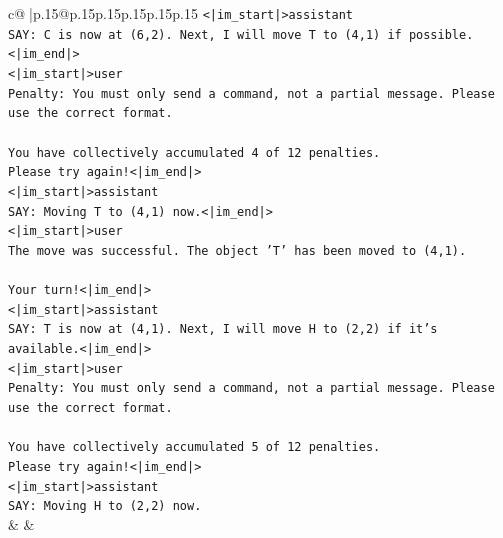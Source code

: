 \documentclass{article}
\begin{document}
{\begin{supertabular}{c@{$\;$}|p{.15\linewidth}@{}p{.15\linewidth}p{.15\linewidth}p{.15\linewidth}p{.15\linewidth}p{.15\linewidth}}
{{{\texttt{<|im\_start|>assistant} \\
\texttt{SAY: C is now at (6,2). Next, I will move T to (4,1) if possible.<|im\_end|>} \\
\texttt{<|im\_start|>user} \\
\texttt{Penalty: You must only send a command, not a partial message. Please use the correct format.} \\
\\ 
\texttt{You have collectively accumulated 4 of 12 penalties.} \\
\texttt{Please try again!<|im\_end|>} \\
\texttt{<|im\_start|>assistant} \\
\texttt{SAY: Moving T to (4,1) now.<|im\_end|>} \\
\texttt{<|im\_start|>user} \\
\texttt{The move was successful. The object 'T' has been moved to (4,1).} \\
\\ 
\texttt{Your turn!<|im\_end|>} \\
\texttt{<|im\_start|>assistant} \\
\texttt{SAY: T is now at (4,1). Next, I will move H to (2,2) if it's available.<|im\_end|>} \\
\texttt{<|im\_start|>user} \\
\texttt{Penalty: You must only send a command, not a partial message. Please use the correct format.} \\
\\ 
\texttt{You have collectively accumulated 5 of 12 penalties.} \\
\texttt{Please try again!<|im\_end|>} \\
\texttt{<|im\_start|>assistant} \\
\texttt{SAY: Moving H to (2,2) now.} \\
            }
        }
    }
    & & \\ \\


\end{supertabular}}
\end{document}
